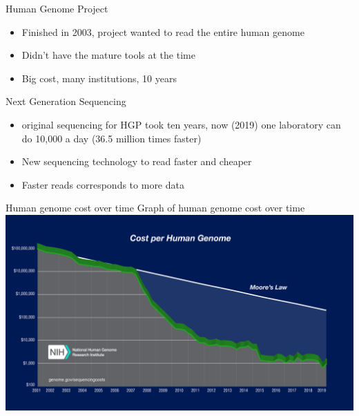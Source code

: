 \documentclass{beamer}
\begin{document}
\begin{frame}{Human Genome Project}
  \begin{itemize}   
    \item Finished in 2003, project wanted to read the entire human genome
    \item Didn't have the mature tools at the time
    \item Big cost, many institutions, 10 years \cite{introgenomics}
  \end{itemize}
\end{frame}

\begin{frame}{Next Generation Sequencing}
  \begin{itemize}
    \item original sequencing for HGP took ten years, now (2019) one laboratory can do 10,000 a day (36.5 million times faster)  \cite[p.~19]{introgenomics}   
    \item New sequencing technology to read faster and cheaper
    \item Faster reads corresponds to more data
  \end{itemize}
\end{frame}

\begin{frame}{Human genome cost over time}
Graph of human genome cost over time \cite{genomics-cost} \\
\centering
\includegraphics[scale=0.3]{human-gen-cost.jpg}
\end{frame}
    
\end{document}
